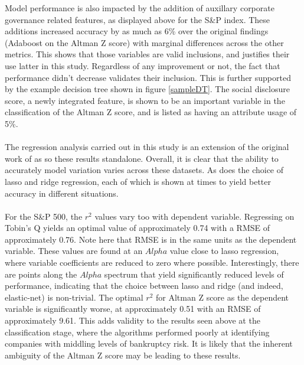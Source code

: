 Model performance is also impacted by the addition of auxillary corporate governance related features, as displayed above for the S\&P index. These additions increased accuracy by as much as 6\% over the original findings (Adaboost on the Altman Z score) with marginal differences across the other metrics. This shows that those variables are valid inclusions, and justifies their use latter in this study. Regardless of any improvement or not, the fact that performance didn't decrease validates their inclusion. This is further supported by the example decision tree shown in figure \ref{sampleDT}. The social disclosure score, a newly integrated feature, is shown to be an important variable in the classification of the Altman Z score, and is listed as having an attribute usage of 5\%. \\\\
The regression analysis carried out in this study is an extension of the original work of \cite{moldovan2015learning} as so these results standalone. Overall, it is clear that the ability to accurately model variation varies across these datasets. As does the choice of lasso and ridge regression, each of which is shown at times to yield better accuracy in different situations. 
\\\\
For the S\&P 500, the $r^2$ values vary too with dependent variable. Regressing on Tobin's Q yields an optimal value of approximately 0.74 with a RMSE of approximately 0.76. Note here that RMSE is in the same units as the dependent variable. These values are found at an $Alpha$ value close to lasso regression, where variable coefficients are reduced to zero where possible. Interestingly, there are points along the $Alpha$ spectrum that yield significantly reduced levels of performance, indicating that the choice between lasso and ridge (and indeed, elastic-net) is non-trivial. The optimal $r^2$ for Altman Z score as the dependent variable is significantly worse, at approximately 0.51 with an RMSE of approximately 9.61. This adds validity to the results seen above at the classification stage, where the algorithms performed poorly at identifying companies with middling levels of bankruptcy risk. It is likely that the inherent ambiguity of the Altman Z score may be leading to these results. \\\\
